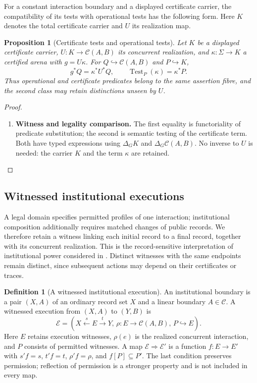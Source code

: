 \documentclass[11pt,a4paper]{article}
\numberwithin{equation}{section}
\newtheorem{proposition}[theorem]{Proposition}
\theoremstyle{definition}
\newtheorem{definition}[theorem]{Definition}
\theoremstyle{remark}
\theoremstyle{plain}
\begin{document}
For a constant interaction boundary and a displayed certificate carrier,
the compatibility of its tests with operational tests has the following
form. Here $K$ denotes the total certificate carrier and $U$ its
realization map.

\begin{proposition}[Certificate tests and operational tests]
\label{prop:fib-certificate-tests}
Let $K$ be a displayed certificate carrier,
$U:K\to\mathcal C(A,B)$ its concurrent realization, and
$\kappa:\Sigma\to K$ a certified arena with $g=U\kappa$.
For $Q\hookrightarrow\mathcal C(A,B)$ and $P\hookrightarrow K$,
\[
 g^*Q=\kappa^*U^*Q,
 \qquad \operatorname{Test}_P(\kappa)=\kappa^*P.
\]
Thus operational and certificate predicates belong to the same assertion
fibre, and the second class may retain distinctions unseen by $U$.
\end{proposition}
\begin{proof}
\leavevmode
\begin{enumerate}[label=\textup{(\arabic*)},leftmargin=*,itemsep=4pt,topsep=3pt]
  \item \textbf{Witness and legality comparison.} The first equality is functoriality of predicate substitution; the second
is semantic testing of the certificate term. Both have typed expressions
using $\Delta_GK$ and $\Delta_G\mathcal C(A,B)$. No inverse to $U$
is needed: the carrier $K$ and the term $\kappa$ are retained.
\end{enumerate}
\end{proof}

\subsection{Witnessed institutional executions}
\label{sec:egt-institutional-executions}

A legal domain specifies permitted profiles of one interaction;
institutional composition additionally requires matched changes of public
records. We therefore retain a witness linking each initial record to a
final record, together with its concurrent realization. This is the
record-sensitive interpretation of institutional power considered in
\citet{JonesSergot1996InstitutionalPower}. Distinct witnesses with the
same endpoints remain distinct, since subsequent actions may depend on
their certificates or traces.

\begin{definition}[A witnessed institutional execution]
\label{def:egt-witnessed-institution}
An institutional boundary is a pair $(X,A)$ of an ordinary record set
$X$ and a linear boundary $A\in\mathcal C$. A witnessed execution from
$(X,A)$ to $(Y,B)$ is
\[
 \mathcal E=(X\xleftarrow{s}E\xrightarrow{t}Y,\,
             \rho:E\to\mathcal C(A,B),\,P\hookrightarrow E).
\]
Here $E$ retains execution witnesses, $\rho(e)$ is the realized
concurrent interaction, and $P$ consists of permitted witnesses.
A map $\mathcal E\Rightarrow\mathcal E'$ is a function $f:E\to E'$
with $s'f=s$, $t'f=t$, $\rho'f=\rho$, and $f[P]\subseteq P'$.
The last condition preserves permission; reflection of permission
is a stronger property and is not included in every map.
\end{definition}
\end{document}
